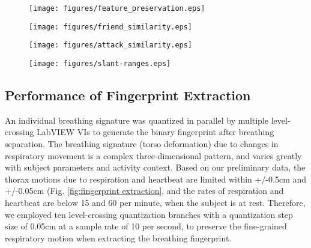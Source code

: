 \begin{figure*}[t]
\begin{subfigure}[t]{0.24\textwidth}
\texttt{[image: figures/feature\_preservation.eps]}
\end{subfigure}
\hspace{\fill}
\begin{subfigure}[t]{0.24\textwidth}
\texttt{[image: figures/friend\_similarity.eps]}
\end{subfigure}
\hspace{\fill}
\begin{subfigure}[t]{0.24\textwidth}
\texttt{[image: figures/attack\_similarity.eps]}
\end{subfigure}
\hspace{\fill}
\begin{subfigure}[t]{0.24\textwidth}
\texttt{[image: figures/slant-ranges.eps]}
\end{subfigure}
\caption{Left to right:(a) Signal reconstructed after 64-level-crossing quantization with vital related dynamic features preserved; (b)  Similarity between belt-based and PRMS-based breathing patterns, measured with the same subject; (c) Similarity between belt-based and PRMS-based breathing patterns, measured with different subjects; (d) The effect on the fingerprint similarity due to the change of slant range between the PRMS and the subject.}
\label{fig:fingerprint extraction}
\end{figure*}

\subsection{Performance of Fingerprint Extraction}
An individual breathing signature was quantized in parallel by multiple level-crossing LabVIEW VIs to generate the binary fingerprint after breathing separation. The breathing signature (torso deformation) due to changes in respiratory movement is a complex three-dimensional pattern, and varies greatly with subject parameters and activity context. Based on our preliminary data, the thorax motions due to respiration and heartbeat are limited within +/-0.5cm and +/-0.05cm (Fig. \ref{fig:fingerprint extraction}, and the rates of respiration and heartbeat are below 15 and 60 per minute, when the subject is at rest. Therefore, we employed ten level-crossing quantization branches with a quantization step size of 0.05cm at a sample rate of 10 per second, to preserve the fine-grained respiratory motion when extracting the breathing fingerprint.

